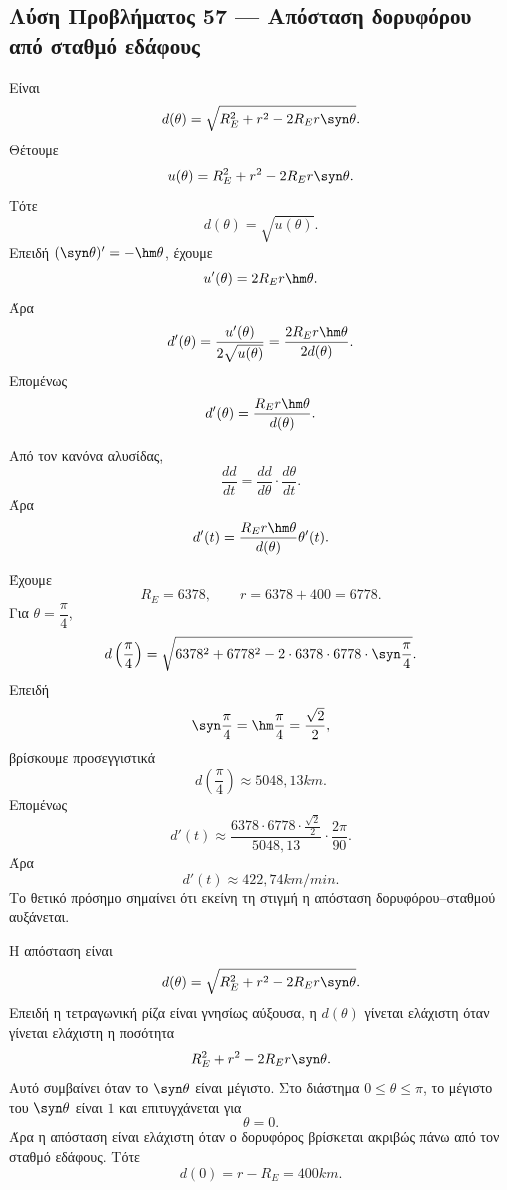 \subsection*{Λύση Προβλήματος 57 --- Απόσταση δορυφόρου από σταθμό εδάφους}

\begin{alist}
  \item Είναι
        \[
          d(\theta)
          =
          \sqrt{R_E^2+r^2-2R_Er\syn\theta}.
        \]
        Θέτουμε
        \[
          u(\theta)=R_E^2+r^2-2R_Er\syn\theta.
        \]
        Τότε
        \[
          d(\theta)=\sqrt{u(\theta)}.
        \]
        Επειδή \((\syn\theta)'=-\hm\theta\), έχουμε
        \[
          u'(\theta)=2R_Er\hm\theta.
        \]
        Άρα
        \[
          d'(\theta)
          =
          \frac{u'(\theta)}{2\sqrt{u(\theta)}}
          =
          \frac{2R_Er\hm\theta}{2d(\theta)}.
        \]
        Επομένως
        \[
          {
          d'(\theta)=\frac{R_Er\hm\theta}{d(\theta)}
          }.
        \]

  \item Από τον κανόνα αλυσίδας,
        \[
          \frac{dd}{dt}
          =
          \frac{dd}{d\theta}\cdot\frac{d\theta}{dt}.
        \]
        Άρα
        \[
          d'(t)
          =
          \frac{R_Er\hm\theta}{d(\theta)}\theta'(t).
        \]

        Έχουμε
        \[
          R_E=6378,\qquad r=6378+400=6778.
        \]
        Για \(\theta=\dfrac{\pi}{4}\),
        \[
          d\left(\frac{\pi}{4}\right)
          =
          \sqrt{
          6378^2+6778^2
          -2\cdot6378\cdot6778\cdot\syn\frac{\pi}{4}
          }.
        \]
        Επειδή
        \[
          \syn\frac{\pi}{4}=\hm\frac{\pi}{4}=\frac{\sqrt2}{2},
        \]
        βρίσκουμε προσεγγιστικά
        \[
          d\left(\frac{\pi}{4}\right)\approx5048{,}13\si{km}.
        \]
        Επομένως
        \[
          d'(t)
          \approx
          \frac{6378\cdot6778\cdot\frac{\sqrt2}{2}}
               {5048{,}13}
          \cdot
          \frac{2\pi}{90}.
        \]
        Άρα
        \[
          {
          d'(t)\approx422{,}74\si{km/min}
          }.
        \]
        Το θετικό πρόσημο σημαίνει ότι εκείνη τη στιγμή η απόσταση
        δορυφόρου--σταθμού αυξάνεται.

  \item Η απόσταση είναι
        \[
          d(\theta)=\sqrt{R_E^2+r^2-2R_Er\syn\theta}.
        \]
        Επειδή η τετραγωνική ρίζα είναι γνησίως αύξουσα, η \(d(\theta)\)
        γίνεται ελάχιστη όταν γίνεται ελάχιστη η ποσότητα
        \[
          R_E^2+r^2-2R_Er\syn\theta.
        \]
        Αυτό συμβαίνει όταν το \(\syn\theta\) είναι μέγιστο. Στο διάστημα
        \(0\leq\theta\leq\pi\), το μέγιστο του \(\syn\theta\) είναι \(1\)
        και επιτυγχάνεται για
        \[
          \theta=0.
        \]
        Άρα η απόσταση είναι ελάχιστη όταν ο δορυφόρος βρίσκεται ακριβώς
        πάνω από τον σταθμό εδάφους. Τότε
        \[
          d(0)=r-R_E=400\si{km}.
        \]
\end{alist}
